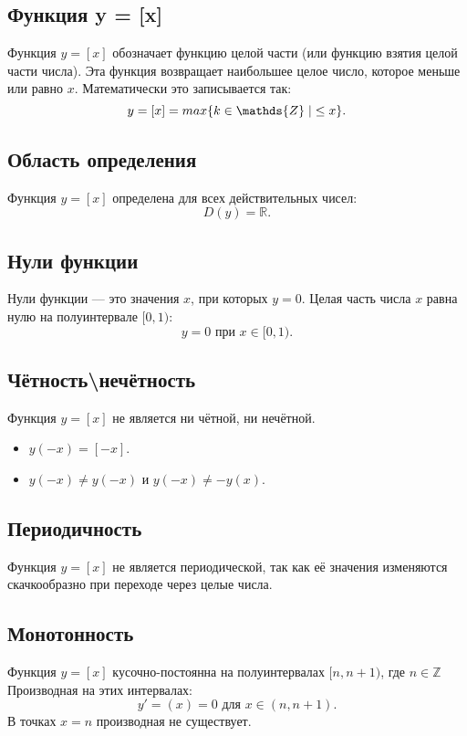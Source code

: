 	\begin{flushleft}
		
		\section{Функция y = [x]}
		Функция $y=[x]$ обозначает функцию целой части (или функцию взятия целой части числа). Эта функция возвращает наибольшее целое число, которое меньше или равно $x$. \n
		Математически это записывается так:
		\[y=[x]=max\{k\in\mathds{Z} \mid \hspace{1mm} \leq x\}.\]
		
		\subsection*{Область определения}
		Функция $y=[x]$ определена для всех действительных чисел:
		\[D(y)=\mathds{R}.\]
		
		\subsection*{Нули функции}
		Нули функции — это значения $x$, при которых $y=0$. Целая часть числа $x$ равна нулю на полуинтервале $[0,1)$:
		\[y=0 \text{ при } x\in[0,1).\]
		
		\subsection*{Чётность\textbackslash нечётность}
		Функция $y=[x]$ не является ни чётной, ни нечётной.
		
		\begin{itemize}
			\item $y(-x) = [-x]$.
			\item $ y(-x)\neq y(-x) \text{ и } y(-x) \neq -y(x)$.
		\end{itemize}
		
		\subsection*{Периодичность}
		Функция $y=[x]$ не является периодической, так как её значения изменяются скачкообразно при переходе через целые числа.
		
		\subsection*{Монотонность}
		Функция $y=[x]$ кусочно-постоянна на полуинтервалах $[n,n+1)$, где $n\in\mathds{Z}$ Производная на этих интервалах:
		\[y'=(x)=0\text{ для }x\in(n,n+1).\]
		В точках $x=n$ производная не существует.
		

\end{flushleft}
